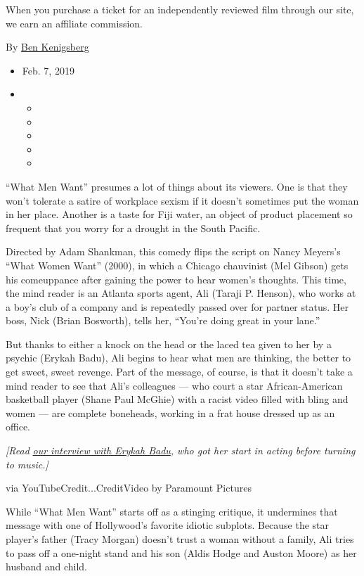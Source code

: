 When you purchase a ticket for an independently reviewed film through
our site, we earn an affiliate commission.

By \href{https://www.nytimes.com/by/ben-kenigsberg}{Ben Kenigsberg}

\begin{itemize}
\item
  Feb. 7, 2019
\item
  \begin{itemize}
  \item
  \item
  \item
  \item
  \item
  \end{itemize}
\end{itemize}

``What Men Want'' presumes a lot of things about its viewers. One is
that they won't tolerate a satire of workplace sexism if it doesn't
sometimes put the woman in her place. Another is a taste for Fiji water,
an object of product placement so frequent that you worry for a drought
in the South Pacific.

Directed by Adam Shankman, this comedy flips the script on Nancy
Meyers's ``What Women Want'' (2000), in which a Chicago chauvinist (Mel
Gibson) gets his comeuppance after gaining the power to hear women's
thoughts. This time, the mind reader is an Atlanta sports agent, Ali
(Taraji P. Henson), who works at a boy's club of a company and is
repeatedly passed over for partner status. Her boss, Nick (Brian
Bosworth), tells her, ``You're doing great in your lane.''

But thanks to either a knock on the head or the laced tea given to her
by a psychic (Erykah Badu), Ali begins to hear what men are thinking,
the better to get sweet, sweet revenge. Part of the message, of course,
is that it doesn't take a mind reader to see that Ali's colleagues ---
who court a star African-American basketball player (Shane Paul McGhie)
with a racist video filled with bling and women --- are complete
boneheads, working in a frat house dressed up as an office.

\emph{{[}Read}
\href{https://www.nytimes.com/2019/02/06/movies/erykah-badu-what-men-want.html}{\emph{our
interview with Erykah Badu}}\emph{, who got her start in acting before
turning to music.{]}}

via YouTubeCredit...CreditVideo by Paramount Pictures

While ``What Men Want'' starts off as a stinging critique, it undermines
that message with one of Hollywood's favorite idiotic subplots. Because
the star player's father (Tracy Morgan) doesn't trust a woman without a
family, Ali tries to pass off a one-night stand and his son (Aldis Hodge
and Auston Moore) as her husband and child.

